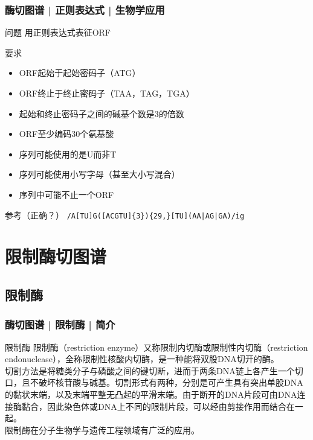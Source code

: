 \begin{frame}[fragile]
  \frametitle{酶切图谱 | 正则表达式 | 生物学应用}
  \begin{block}{问题}
    用正则表达式表征ORF
  \end{block}
  \pause
  \begin{block}{要求}
    \begin{itemize}
      \item ORF起始于起始密码子（ATG）
      \item ORF终止于终止密码子（TAA，TAG，TGA）
      \item 起始和终止密码子之间的碱基个数是3的倍数
      \item ORF至少编码30个氨基酸
      \item 序列可能使用的是U而非T
      \item 序列可能使用小写字母（甚至大小写混合）
      \item 序列中可能不止一个ORF
    \end{itemize}
  \end{block}
  \pause
  \begin{block}{参考\alert{（正确？）}}
    \verb=/A[TU]G([ACGTU]{3}){29,}[TU](AA|AG|GA)/ig=
  \end{block}
\end{frame}

\section{限制酶切图谱}
\subsection{限制酶}
\begin{frame}
  \frametitle{酶切图谱 | 限制酶 | 简介}
  \begin{block}{限制酶}
    限制酶（restriction enzyme）又称限制内切酶或限制性内切酶（restriction endonuclease），全称限制性核酸内切酶，是一种能将双股DNA切开的酶。\\
    \vspace{1em}
    切割方法是将糖类分子与磷酸之间的键切断，进而于两条DNA链上各产生一个切口，且不破坏核苷酸与碱基。切割形式有两种，分别是可产生具有突出单股DNA的黏状末端，以及末端平整无凸起的平滑末端。由于断开的DNA片段可由DNA连接酶黏合，因此染色体或DNA上不同的限制片段，可以经由剪接作用而结合在一起。\\
    \vspace{1em}
    限制酶在分子生物学与遗传工程领域有广泛的应用。
  \end{block}
\end{frame}

